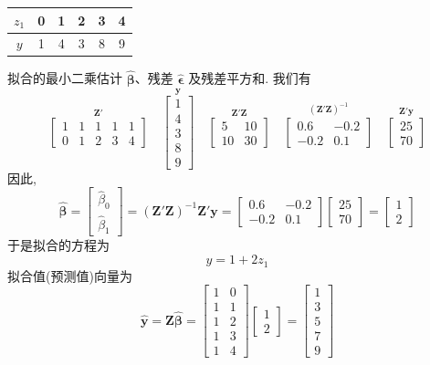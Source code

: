\begin{mvtable}
\begin{tabular}{c|ccccc}
\hline
$z_1$&0&1&2&3&4\\
\hline
$y$&1&4&3&8&9\\
\hline
\end{tabular}
\end{mvtable}

拟合的最小二乘估计 $\hat{\boldsymbol{\beta}}$、残差 $\hat{\boldsymbol{\epsilon}}$ 及残差平方和. 我们有
\[
\overset{\mathbf{Z}'}{\begin{bmatrix}1&1&1&1&1\\0&1&2&3&4\end{bmatrix}}
\quad
\overset{\mathbf{y}}{\begin{bmatrix}1\\4\\3\\8\\9\end{bmatrix}}
\quad
\overset{\mathbf{Z}'\mathbf{Z}}{\begin{bmatrix}5&10\\10&30\end{bmatrix}}
\quad
\overset{(\mathbf{Z}'\mathbf{Z})^{-1}}{\begin{bmatrix}0.6&-0.2\\-0.2&0.1\end{bmatrix}}
\quad
\overset{\mathbf{Z}'\mathbf{y}}{\begin{bmatrix}25\\70\end{bmatrix}}
\]
因此,
\[
\hat{\boldsymbol{\beta}}=\begin{bmatrix}\hat{\beta}_0\\\hat{\beta}_1\end{bmatrix}
=(\mathbf{Z}'\mathbf{Z})^{-1}\mathbf{Z}'\mathbf{y}
=\begin{bmatrix}0.6&-0.2\\-0.2&0.1\end{bmatrix}\begin{bmatrix}25\\70\end{bmatrix}
=\begin{bmatrix}1\\2\end{bmatrix}
\]
于是拟合的方程为
\[
\hat{y}=1+2z_1
\]
拟合值(预测值)向量为
\[
\hat{\mathbf{y}}=\mathbf{Z}\hat{\boldsymbol{\beta}}
=\begin{bmatrix}1&0\\1&1\\1&2\\1&3\\1&4\end{bmatrix}\begin{bmatrix}1\\2\end{bmatrix}
=\begin{bmatrix}1\\3\\5\\7\\9\end{bmatrix}
\]
